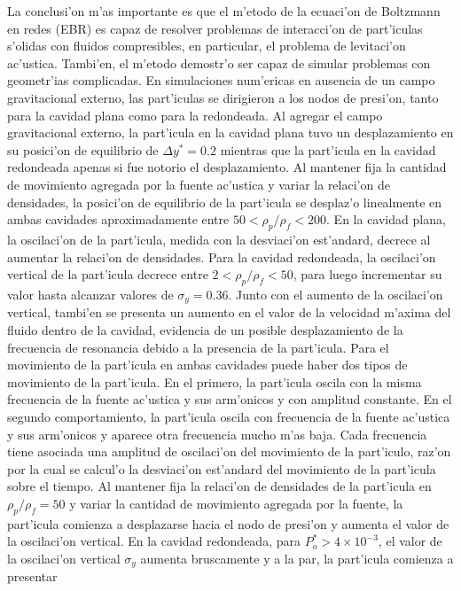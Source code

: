 La conclusi'on m'as importante es que el m'etodo de la ecuaci'on de Boltzmann en redes (EBR)
es capaz de resolver problemas de interacci'on de part'iculas s'olidas con fluidos compresibles,
en particular, el problema de levitaci'on ac'ustica. Tambi'en, el m'etodo demostr'o ser capaz
de simular problemas con geometr'ias complicadas. En simulaciones num'ericas en ausencia de
un campo gravitacional externo, las part'iculas se dirigieron a los nodos de presi'on, tanto 
para la cavidad plana como para la redondeada.  Al agregar el campo gravitacional externo, la
part'icula en la cavidad plana tuvo un desplazamiento en su posici'on de equilibrio de
$\Delta y^\ast = 0.2$ mientras que la part'icula en la cavidad redondeada apenas si fue
notorio el desplazamiento. Al mantener fija la cantidad de movimiento agregada por la fuente
ac'ustica y variar la relaci'on de densidades, la posici'on de equilibrio de la part'icula se desplaz'o
linealmente en ambas cavidades aproximadamente entre $50< \rho_p/\rho_f <200$. En la cavidad plana, la 
oscilaci'on de la part'icula, medida con la desviaci'on est'andard, decrece al aumentar la relaci'on de
densidades. Para la cavidad redondeada, la oscilaci'on vertical de la part'icula decrece entre
 $2< \rho_p/\rho_f <50$, para luego incrementar su valor hasta alcanzar valores de $\sigma_y=0.36$.
Junto con el aumento de la oscilaci'on vertical, tambi'en se presenta un aumento en el valor de la 
velocidad m'axima del fluido dentro de la cavidad, evidencia de un posible desplazamiento de la
frecuencia de resonancia debido a la presencia de la part'icula. Para el movimiento de la part'icula
en ambas cavidades puede haber dos tipos de movimiento de la part'icula. En el primero, la part'icula
oscila con la misma frecuencia de la fuente ac'ustica  y sus arm'onicos 
y con amplitud constante. En el segundo comportamiento, la part'icula oscila con frecuencia 
de la fuente ac'ustica y sus arm'onicos y aparece otra frecuencia mucho m'as baja. Cada frecuencia
tiene asociada una amplitud de oscilaci'on del movimiento de la part'iculo, raz'on por la cual se
calcul'o la desviaci'on est'andard del movimiento de la part'icula sobre el tiempo.
Al mantener fija la relaci'on de densidades de la part'icula en $\rho_p/\rho_f=50$ y variar la 
cantidad de movimiento agregada por la fuente, la part'icula comienza a desplazarse hacia el nodo de presi'on 
y aumenta el valor de la oscilaci'on vertical. En la cavidad redondeada, para $P_o^\ast >4\times 10^{-3}$, 
el valor de la oscilaci'on vertical $\sigma_y$ aumenta bruscamente y a la par, la part'icula comienza a presentar

